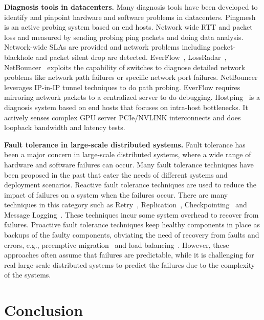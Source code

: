 \documentclass[letterpaper,twocolumn,10pt]{article}
\newcommand{\parabf}[1]{\medskip\noindent\textbf{#1}}
\begin{document}
\parabf{Diagnosis tools in datacenters.} Many diagnosis tools have been developed
to identify and pinpoint hardware and software problems in datacenters.
Pingmesh~\cite{pingmesh} is an active
probing system based on end hosts. Network wide RTT and packet loss and measured
by sending probing ping packets and doing data analysis. Network-wide SLAs are
provided and network problems including packet-blackhole and packet silent drop
are detected.  EverFlow~\cite{everflow}, LossRadar~\cite{lossradar},
NetBouncer~\cite{netbouncer} exploits the capability of switches to diagnose
detailed network problems like network path failures or specific network port
failures. NetBouncer leverages IP-in-IP tunnel techniques to do path probing.
EverFlow requires mirroring network packets to a centralized server to do
debugging. Hostping~\cite{hostping} is a diagnosis system based on
end hosts that focuses on intra-host bottlenecks. It actively senses complex GPU
server PCIe/NVLINK interconnects and does loopback bandwidth and latency tests.

\parabf{Fault tolerance in large-scale distributed systems.}
Fault tolerance has been a major concern in large-scale distributed systems,
where a wide range of hardware and software failures can occur.
Many fault tolerance techniques have been proposed in the past
that cater the needs of different
systems and deployment scenarios.
Reactive fault
tolerance techniques are used to reduce the impact of failures on a system when
the failures occur. There are many techniques in this category such
as Retry~\cite{haider2011fault}, Replication~\cite{haider2011fault},
Checkpointing~\cite{peng2018optimus} and Message
Logging~\cite{tanenbaum2007distributed}.
These techniques incur some system overhead to recover from failures.
Proactive fault tolerance techniques
keep healthy components in place as backups of the faulty
components, obviating the need of recovery from faults and errors, e.g., preemptive
migration~\cite{chakravorty2006proactive, chakravorty2005proactive,
chen2020elastic} and load balancing~\cite{behera2014performance}. However, these
approaches often assume that failures are predictable,
while it is challenging for real
large-scale distributed systems to predict the failures due to the complexity
of the systems.

\section{Conclusion}
\label{sec:conclusion}
\end{document}
